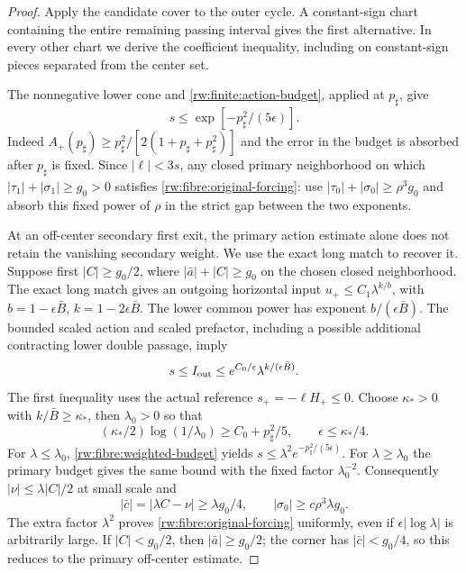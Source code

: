 \begin{proof}
Apply the candidate cover to the outer cycle. A constant-sign chart
containing the entire remaining passing interval gives the first
alternative. In every other chart we derive the coefficient inequality,
including on constant-sign pieces separated from the center set.

The nonnegative lower cone and
\eqref{rw:finite:action-budget}, applied at $p_\sharp$, give
\[
 s\le \exp[-p_\sharp^2/(5\epsilon)].
\]
Indeed
$A_+(p_\sharp)\ge
p_\sharp^2/[2(1+p_\sharp+p_\sharp^2)]$ and the error in
the budget is absorbed after $p_\sharp$ is fixed.
Since $|\ell|<3s$,
any closed primary neighborhood on which
$|\tau_1|+|\sigma_1|\ge g_0>0$ satisfies
\eqref{rw:fibre:original-forcing}: use
$|\tau_0|+|\sigma_0|\ge\rho^3g_0$ and absorb this fixed
power of $\rho$ in the strict gap between the two exponents.

At an off-center secondary first exit, the primary action estimate
alone does not retain the vanishing secondary weight. We use the exact
long match to recover it.
Suppose first $|C|\ge g_0/2$, where
$|\bar a|+|C|\ge g_0$ on the chosen closed neighborhood.
The exact long match gives an outgoing horizontal input
$u_+\le C_1\lambda^{k/b}$, with
$b=1-\epsilon\bar B$, $k=1-2\epsilon\bar B$.
The lower common power has exponent $b/(\epsilon\bar B)$.
The bounded scaled action and scaled prefactor, including a
possible additional contracting lower double passage, imply
\begin{equation}\label{rw:fibre:weighted-budget}
 s\le I_{\rm out}
       \le e^{C_0/\epsilon}\lambda^{k/(\epsilon\bar B)}.
\end{equation}
The first inequality uses the actual reference
$s_+=-\ell H_+\le0$. Choose $\kappa_*>0$ with
$k/\bar B\ge\kappa_*$, then $\lambda_0>0$ so that
\[
 (\kappa_*/2)\log(1/\lambda_0)
                    \ge C_0+p_\sharp^2/5,
 \qquad \epsilon\le\kappa_*/4.
\]
For $\lambda\le\lambda_0$,
\eqref{rw:fibre:weighted-budget} yields
$s\le\lambda^2e^{-p_\sharp^2/(5\epsilon)}$.
For $\lambda\ge\lambda_0$ the primary budget gives the same
bound with the fixed factor $\lambda_0^{-2}$. Consequently
$|\nu|\le\lambda|C|/2$ at small scale and
\[
 |\bar c|=|\lambda C-\nu|\ge\lambda g_0/4,\qquad
 |\sigma_0|\ge c\rho^3\lambda g_0 .
\]
The extra factor $\lambda^2$ proves
\eqref{rw:fibre:original-forcing} uniformly, even if
$\epsilon|\log\lambda|$ is arbitrarily large.
If $|C|<g_0/2$, then $|\bar a|\ge g_0/2$; the corner
has $|\bar c|<g_0/4$, so this reduces to the primary
off-center estimate.


\end{proof}
